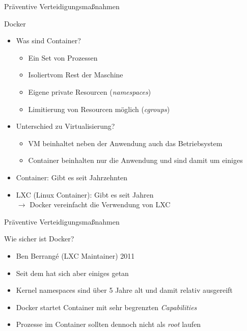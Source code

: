 \begin{frame}{Präventive Verteidigungsmaßnahmen}
  \begin{block}{Docker}
    \begin{itemize}[<+->]
      \item Was sind Container?
      \begin{itemize}[<+->]
        \item Ein Set von Prozessen
        \item Isoliert\footnotemark vom Rest der Maschine
        \item Eigene private Resourcen (\textit{namespaces})
        \item Limitierung von Resourcen möglich (\textit{cgroups})
      \end{itemize}
      \item Unterschied zu Virtualisierung?
      \begin{itemize}[<+->]
        \item VM beinhaltet neben der Anwendung auch das Betriebsystem
        \item Container beinhalten nur die Anwendung und sind damit um einiges 
      \end{itemize}
      \item Container: Gibt es seit Jahrzehnten
      \item LXC (Linux Container): Gibt es seit Jahren \\
      $\rightarrow$ Docker vereinfacht die Verwendung von LXC
    \end{itemize}
  \end{block}

\end{frame}

\begin{frame}{Präventive Verteidigungsmaßnahmen}
  \begin{block}{Wie sicher ist Docker?}
    \begin{itemize}[<+->]
      \item {} Ben Berrangé (LXC Maintainer) 2011\footnotemark
      \item Seit dem hat sich aber einiges getan
      \item Kernel namespaces sind über 5 Jahre alt und damit relativ ausgereift
      \item Docker startet Container mit sehr begrenzten \textit{Capabilities}
      \item Prozesse im Container sollten dennoch nicht als \textit{root} laufen
    \end{itemize}
  \end{block}

\end{frame}

